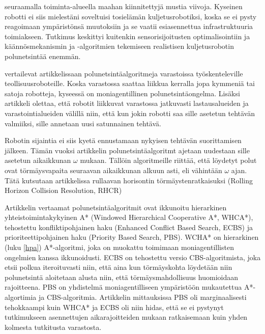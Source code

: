 seuraamalla toiminta-alueella maahan kiinnitettyjä mustia viivoja. Kyseinen 
robotti ei siis mielestäni soveltuisi tosielämän kuljetusrobotiksi, koska se 
ei pysty reagoimaan ympäristönsä muutoksiin ja se vaatii esiasennettua 
infrastruktuuria toimiakseen. Tutkimus keskittyi kuitenkin sensorisijoitusten 
optimalisointiin ja käännösmekanismin ja -algoritmien tekemiseen realistisen 
kuljetusrobotin polunetsintää enemmän. \par
	\textcite{warehouse} vertailevat artikkelissaan 
polunetsintäalgoritmeja varastoissa työskenteleville teollisuusroboteille. 
Koska varastossa saattaa liikkua kerralla jopa kymmeniä tai satoja robotteja, 
kyseessä on moniagentillinen polunetsintäongelma. Lisäksi artikkeli olettaa, 
että robotit liikkuvat varastossa jatkuvasti lastausalueiden ja 
varastointialueiden välillä niin, että kun jokin robotti saa sille asetetun 
tehtävän valmiiksi, sille annetaan uusi satunnainen tehtävä. \par
	Robotin sijaintia ei siis kyetä ennustamaan nykyisen tehtävän 
suorittamisen jälkeen. Tämän vuoksi artikkelin polunetsintäalgoritmt ajetaan 
uudestaan sille asetetun aikaikkunan $\omega$ mukaan. Tällöin algoritmeille 
riittää, että löydetyt polut ovat törmäysvapaita seuraavan aikaikkunan alkuun 
asti, eli vähintään $\omega$ ajan. Tätä kutsutaan artikkelissa rullaavan 
horisontin törmäystenratkaisuksi (Rolling Horizon Collision Resolution, 
RHCR)\par
	Artikkelin vertaamat polunetsintäalgoritmit ovat ikkunoitu 
hierarkinen yhteistoimintakykyinen A* (Windowed Hierarchical Cooperative A*, 
WHCA*), tehostettu konfliktipohjainen haku (Enhanced Conflict Based Search, 
ECBS) ja prioriteettipohjainen haku (Priority Based Search, PBS). WCHA* on 
hierarkinen (luku \ref{hpa}) A*-algoritmi, joka on muokattu toimimaan 
moniagentillisten ongelmien kanssa ikkunoidusti. ECBS on tehostettu versio 
CBS-algoritmista, joka etsii polkua iteroituvasti niin, että aina kun 
törmäyskohta löydetään niin polunetsintä aloitetaan alusta niin, että 
törmäysmahdollisuus huomioidaan rajoitteena. PBS on yhdistelmä 
moniagentilliseen ympäristöön mukautettua A*-algortimia ja CBS-algoritmia. 
Artikkelin mittauksissa PBS oli marginaalisesti tehokkaampi kuin WHCA* ja 
ECBS oli niin hidas, että se ei pystynyt tutkimukseen asennettujen 
aikarajoitteiden mukaan ratkaisemaan kuin yhden kolmesta tutkitusta 
varastosta.
